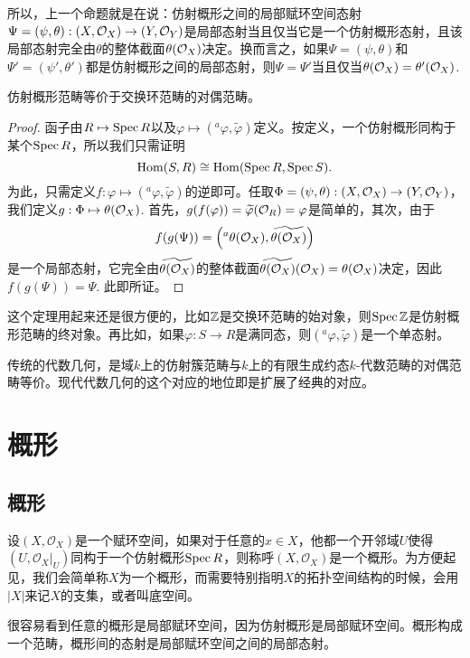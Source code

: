 所以，上一个命题就是在说：仿射概形之间的局部赋环空间态射$\Psi=(\psi,\theta):(X,\mathcal{O}_X)\to (Y,\mathcal{O}_Y)$是局部态射当且仅当它是一个仿射概形态射，且该局部态射完全由$\theta$的整体截面$\theta(\mathcal{O}_X)$决定。换而言之，如果$\Psi=(\psi,\theta)$和$\Psi'=(\psi',\theta')$都是仿射概形之间的局部态射，则$\Psi=\Psi'$当且仅当$\theta(\mathcal{O}_X)=\theta'(\mathcal{O}_X)$.

\begin{thm}
仿射概形范畴等价于交换环范畴的对偶范畴。
\end{thm}

\begin{proof}
函子由$R\mapsto \operatorname{Spec} R$以及$\varphi\mapsto ({}^a\varphi,\widetilde{\varphi})$定义。按定义，一个仿射概形同构于某个$\operatorname{Spec} R$，所以我们只需证明
\[
	\operatorname{Hom}(S,R)\cong \operatorname{Hom}(\operatorname{Spec} R,\operatorname{Spec} S).
\]
为此，只需定义$f:\varphi\mapsto ({}^a\varphi,\widetilde{\varphi})$的逆即可。任取$\Phi=(\psi,\theta):(X,\mathcal{O}_X)\to (Y,\mathcal{O}_Y)$，我们定义$g:\Phi\mapsto \theta(\mathcal{O}_X)$. 首先，$g(f(\varphi))=\widetilde{\varphi}(\mathcal{O}_R)=\varphi$是简单的，其次，由于
\[
f(g(\Psi))=\left({}^a\theta(\mathcal{O}_X),\widetilde{\theta(\mathcal{O}_X)}\right)
\]
是一个局部态射，它完全由$\widetilde{\theta(\mathcal{O}_X)}$的整体截面$\widetilde{\theta(\mathcal{O}_X)}(\mathcal{O}_X)=\theta(\mathcal{O}_X)$决定，因此$f(g(\Psi))=\Psi$. 此即所证。
\end{proof}

这个定理用起来还是很方便的，比如$\mathbb{Z}$是交换环范畴的始对象，则$\operatorname{Spec} \mathbb{Z}$是仿射概形范畴的终对象。再比如，如果$\varphi:S\to R$是满同态，则$({}^a\varphi,\widetilde{\varphi})$是一个单态射。

传统的代数几何，是域$k$上的仿射簇范畴与$k$上的有限生成约态$k$-代数范畴的对偶范畴等价。现代代数几何的这个对应的地位即是扩展了经典的对应。

\chapter{概形}
\section{概形}

\begin{para}[概形]
设$(X,\mathcal{O}_X)$是一个赋环空间，如果对于任意的$x\in X$，他都一个开邻域$U$使得$(U,\mathcal{O}_X|_U)$同构于一个仿射概形$\operatorname{Spec}{R}$，则称呼$(X,\mathcal{O}_X)$是一个概形。为方便起见，我们会简单称$X$为一个概形，而需要特别指明$X$的拓扑空间结构的时候，会用$|X|$来记$X$的支集，或者叫底空间。

很容易看到任意的概形是局部赋环空间，因为仿射概形是局部赋环空间。概形构成一个范畴，概形间的态射是局部赋环空间之间的局部态射。
\end{para}

